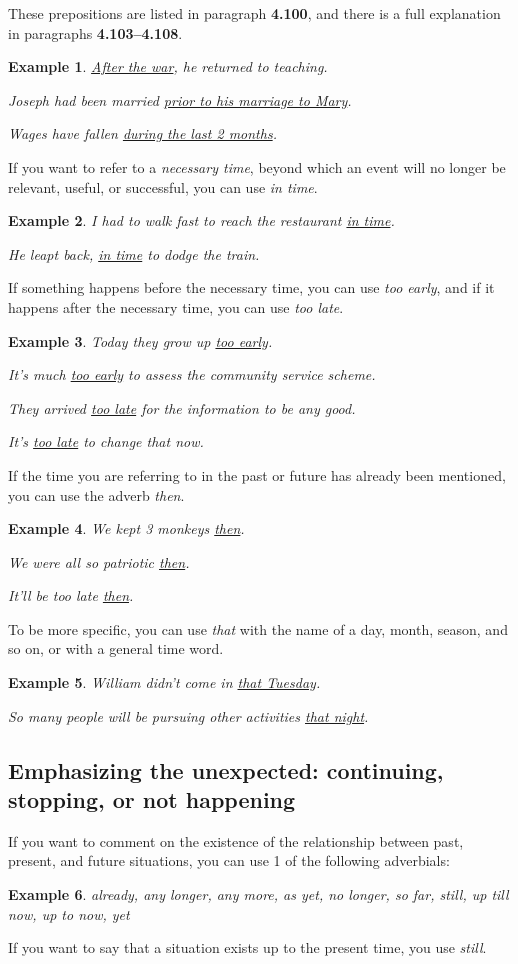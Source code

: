 \documentclass[oneside]{book}
\numberwithin{equation}{section}
\newtheorem{example}{Example}[section]
\begin{document}
These prepositions are listed in paragraph \textbf{4.100}, and there is a full explanation in paragraphs \textbf{4.103--4.108}.
\begin{example}
    \underline{After the war}, he returned to teaching.
    
    Joseph had been married \underline{prior to his marriage to Mary}.
    
    Wages have fallen \underline{during the last 2 months}.
\end{example}
%
\noindent{} If you want to refer to a \textit{necessary time}, beyond which an event will no longer be relevant, useful, or successful, you can use \textit{in time}.
\begin{example}
    I had to walk fast to reach the restaurant \underline{in time}.
    
    He leapt back, \underline{in time} to dodge the train.
\end{example}
If something happens before the necessary time, you can use \textit{too early}, and if it happens after the necessary time, you can use \textit{too late}.
\begin{example}
    Today they grow up \underline{too early}.
    
    It's much \underline{too early} to assess the community service scheme.
    
    They arrived \underline{too late} for the information to be any good.
    
    It's \underline{too late} to change that now.
\end{example}
%
\noindent{} If the time you are referring to in the past or future has already been mentioned, you can use the adverb \textit{then}.
\begin{example}
    We kept 3 monkeys \underline{then}.
    
    We were all so patriotic \underline{then}.
    
    It'll be too late \underline{then}.
\end{example}
To be more specific, you can use \textit{that} with the name of a day, month, season, and so on, or with a general time word.
\begin{example}
    William didn't come in \underline{that Tuesday}.
    
    So many people will be pursuing other activities \underline{that night}.
\end{example}

\subsection{Emphasizing the unexpected: continuing, stopping, or not happening}
\noindent{} If you want to comment on the existence of the relationship between past, present, and future situations, you can use 1 of the following adverbials:
\begin{example}
    already, any longer, any more, as yet, no longer, so far, still, up till now, up to now, yet
\end{example}
%
\noindent{} If you want to say that a situation exists up to the present time, you use \textit{still}.
\end{document}
